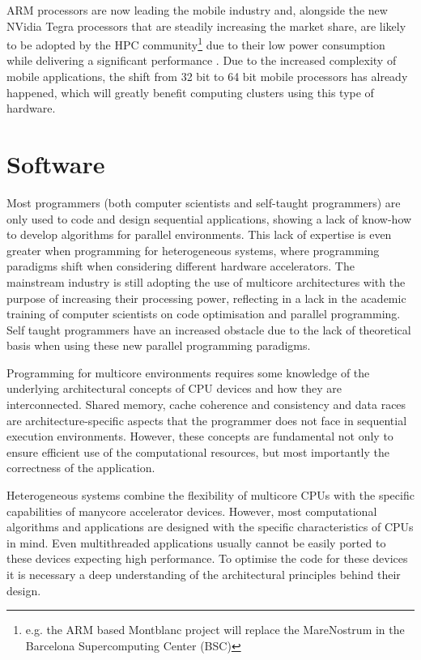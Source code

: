 ARM processors are now leading the mobile industry and, alongside the new NVidia Tegra processors \cite{NVIDIA:Tegra} that are steadily increasing the market share, are likely to be adopted by the HPC community\footnote{e.g. the ARM based Montblanc project will replace the MareNostrum in the Barcelona Supercomputing Center (BSC)} due to their low power consumption while delivering a significant performance \cite{ARM}. Due to the increased complexity of mobile applications, the shift from 32 bit to 64 bit mobile processors has already happened, which will greatly benefit computing clusters using this type of hardware.

\section{Software}
\label{software}

Most programmers (both computer scientists and self-taught programmers) are only used to code and design sequential applications, showing a lack of know-how to develop algorithms for parallel environments. This lack of expertise is even greater when programming for heterogeneous systems, where programming paradigms shift when considering different hardware accelerators. The mainstream industry is still adopting the use of multicore architectures with the purpose of increasing their processing power, reflecting in a lack in the academic training of computer scientists on code optimisation and parallel programming. Self taught programmers have an increased obstacle due to the lack of theoretical basis when using these new parallel programming paradigms.

Programming for multicore environments requires some knowledge of the underlying architectural concepts of CPU devices and how they are interconnected. Shared memory, cache coherence and consistency and data races are architecture-specific aspects that the programmer does not face in sequential execution environments. However, these concepts are fundamental not only to ensure efficient use of the computational resources, but most importantly the correctness of the application.

Heterogeneous systems combine the flexibility of multicore CPUs with the specific capabilities of manycore accelerator devices. However, most computational algorithms and applications are designed with the specific characteristics of CPUs in mind. Even multithreaded applications usually cannot be easily ported to these devices expecting high performance. To optimise the code for these devices it is necessary a deep understanding of the architectural principles behind their design.

